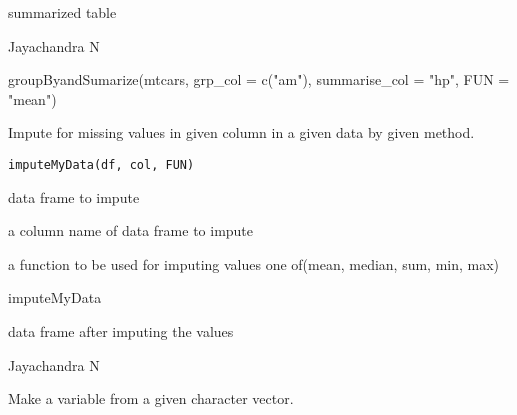 \documentclass[a4paper]{book}
\begin{document}
%
\begin{Value}
summarized table
\end{Value}
%
\begin{Author}\relax
Jayachandra N
\end{Author}
%
\begin{Examples}
\begin{ExampleCode}
groupByandSumarize(mtcars, grp_col = c("am"), summarise_col = "hp", FUN = "mean")
\end{ExampleCode}
\end{Examples}
%
\begin{Description}\relax
Impute for missing values in given column in a given data by given method.
\end{Description}
%
\begin{Usage}
\begin{verbatim}
imputeMyData(df, col, FUN)
\end{verbatim}
\end{Usage}
%
\begin{Arguments}
\begin{ldescription}
\item[\code{df}] data frame to impute

\item[\code{col}] a column name of data frame to impute

\item[\code{FUN}] a function to be used for imputing values one of(mean, median, sum, min, max)
\end{ldescription}
\end{Arguments}
%
\begin{Details}\relax
imputeMyData
\end{Details}
%
\begin{Value}
data frame after imputing the values
\end{Value}
%
\begin{Author}\relax
Jayachandra N
\end{Author}
%
\begin{Examples}
\end{Examples}
%
\begin{Description}\relax
Make a variable from a given character vector.
\end{Description}
\end{document}
